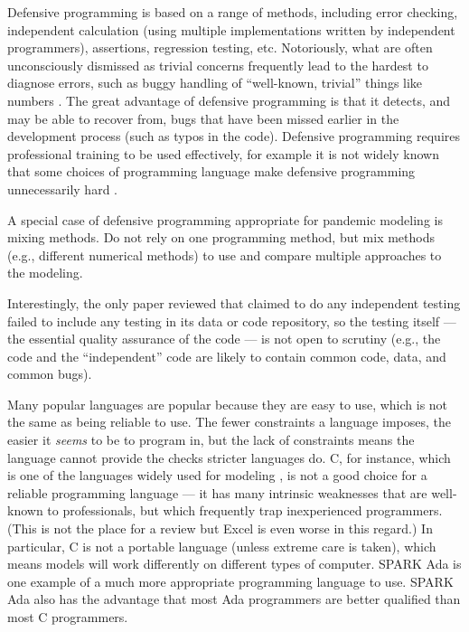 \documentclass[10pt,a4paper]{article}
\begin{document}
 Defensive programming is based on a range of methods, including error checking, independent calculation (using multiple implementations written by independent programmers), assertions, regression testing, etc. Notoriously, what are often unconsciously dismissed as trivial concerns frequently lead to the hardest to diagnose errors, such as buggy handling of ``well-known, trivial'' things like numbers \cite{numerals}. The great advantage of defensive programming is that it detects, and may be able to recover from, bugs that have been missed earlier in the development process (such as typos in the code). Defensive programming requires professional training to be used effectively, for example it is not widely known that some choices of programming language make defensive programming unnecessarily hard \cite{heedless}.

A special case of defensive programming appropriate for pandemic modeling is mixing methods. Do not rely on one programming method, but mix methods (e.g., different numerical methods) to use and compare multiple approaches to the modeling.

\begin{change}Interestingly, the only paper reviewed that claimed to do any independent testing \cite{onlyPaperWithChecks} failed to include any testing in its data or code repository, so the testing itself --- the essential quality assurance of the code --- is not open to scrutiny (e.g., the code and the ``independent'' code are likely to contain common code, data, and common bugs).\end{change}

Many popular languages are popular because they are easy to use, which is not the same as being reliable to use. The fewer constraints a language imposes, the easier it \emph{seems\/} to be to program in, but the lack of constraints means the language cannot provide the checks stricter languages do. C, for instance, which is one of the languages widely used for modeling \cite{tweet,plos}, is not a good choice for a reliable programming language --- it has many intrinsic weaknesses that are well-known to professionals, but which frequently trap inexperienced programmers. (This is not the place for a review \cite{heedless} but Excel is even worse in this regard.) In particular, C is not a portable language (unless extreme care is taken), which means models will work differently on different types of computer. SPARK Ada is one example of a much more appropriate programming language to use. SPARK Ada also has the advantage that most Ada programmers are better qualified than most C programmers.
\end{document}

